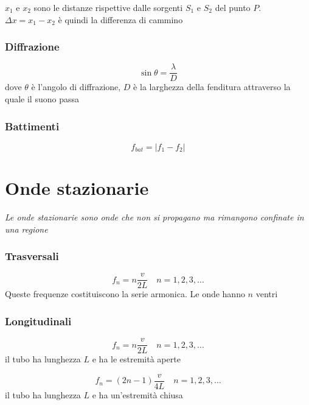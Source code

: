 \documentclass{article}
\begin{document}
$x_1$ e $x_2$ sono le distanze rispettive dalle sorgenti $S_1$ e $S_2$ del punto $P$. \\
$\Delta x = x_1-x_2$ è quindi la differenza di cammino

\subsubsection*{Diffrazione}
$$ \sin{\theta} = \frac{\lambda}{D} $$
dove $\theta$ è l'angolo di diffrazione, $D$ è la larghezza della fenditura attraverso la quale il suono passa

\subsubsection*{Battimenti}
$$ f_{bat} = |f_1 - f_2| $$

\section*{Onde stazionarie}
\textit{Le onde stazionarie sono onde che non si propagano ma rimangono confinate in una regione}

\subsubsection*{Trasversali}
$$ f_n = n \frac{v}{2L} \hspace{1em} n = 1,2,3,\dots $$
Queste frequenze costituiscono la serie armonica. Le onde hanno $n$ ventri

\subsubsection*{Longitudinali}
$$ f_n = n \frac{v}{2L} \hspace{1em} n = 1,2,3,\dots $$
il tubo ha lunghezza $L$ e ha le estremità aperte

\vspace{1em}
$$ f_n = (2n-1) \frac{v}{4L} \hspace{1em} n = 1,2,3,\dots $$
il tubo ha lunghezza $L$ e ha un'estremità chiusa
\end{document}
